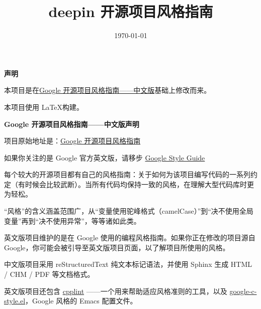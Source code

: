 \documentclass[UTF8,a4paper,oneside]{ctexbook}
\title{deepin 开源项目风格指南}
\date{\today}
\begin{document}
\maketitle

\textbf{声明}

本项目是在\href{https://github.com/zh-google-styleguide/zh-google-styleguide}{Google 开源项目风格指南——中文版}基础上修改而来。

本项目使用 \LaTeX 构建。

\textbf{Google 开源项目风格指南——中文版声明}

项目原始地址是：\href{https://github.com/zh-google-styleguide/zh-google-styleguide}{Google 开源项目风格指南}

如果你关注的是 Google 官方英文版，请移步 \href{https://github.com/google/styleguide}{Google Style Guide}

每个较大的开源项目都有自己的风格指南：关于如何为该项目编写代码的一系列约定（有时候会比较武断）。当所有代码均保持一致的风格，在理解大型代码库时更为轻松。

“风格”的含义涵盖范围广，从“变量使用驼峰格式（camelCase）”到“决不使用全局变量”再到“决不使用异常”，等等诸如此类。

英文版项目维护的是在 Google 使用的编程风格指南。如果你正在修改的项目源自 Google，你可能会被引导至英文版项目页面，以了解项目所使用的风格。

中文版项目采用 reStructuredText 纯文本标记语法，并使用 Sphinx 生成 HTML / CHM / PDF 等文档格式。

英文版项目还包含 \href{https://github.com/google/styleguide/tree/gh-pages/cpplint}{cpplint} ——一个用来帮助适应风格准则的工具，以及 \href{https://raw.githubusercontent.com/google/styleguide/gh-pages/google-c-style.el}{google-c-style.el}，Google 风格的 Emacs 配置文件。

\tableofcontents
\newpage




\end{document}
